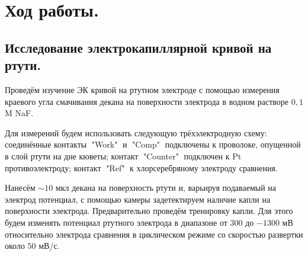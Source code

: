 \documentclass[a4paper, 11pt]{article}%
\begin{document}
\section{Ход работы.}
\subsection{Исследование электрокапиллярной кривой на ртути.} \;
\par Проведём изучение ЭК кривой на ртутном электроде с помощью измерения краевого угла смачивания декана на поверхности электрода в водном растворе $0,1$ M NaF.
\par Для измерений будем использовать следующую трёхэлектродную схему: соединённые контакты $\;$"Work"$\;$ и $\;$"Comp"$\;$ подключены к проволоке, опущенной в слой ртути на дне кюветы; контакт $\;$"Counter"$\;$ подключен к Pt противоэлектроду; контакт $\;$"Ref"$\;$ к хлорсеребряному электроду сравнения.
\par Нанесём $\sim 10$ мкл декана на поверхность ртути и, варьируя подаваемый на электрод потенциал, с помощью камеры задетектируем наличие капли на поверхности электрода. Предварительно проведём тренировку капли. Для этого будем изменять потенциал ртутного электрода в диапазоне от $300$ до $ -1300$ мВ относительно электрода сравнения в циклическом режиме со скоростью развертки около $50$ мВ/с. 
\end{document}
